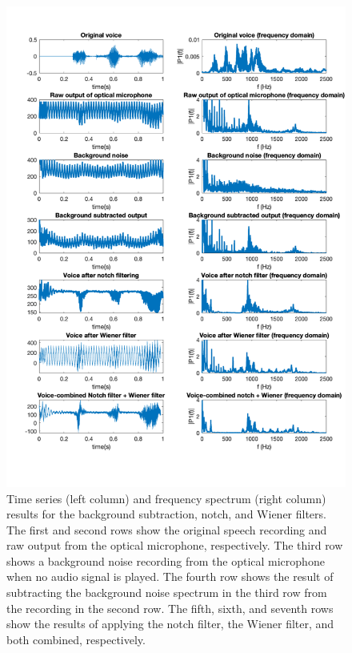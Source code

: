 \documentclass[paper-main.tex]{subfiles}
\begin{document}
\begin{figure}
	\begin{center}
	\includegraphics[width=.8\textwidth, trim={1cm 3cm 1cm 1cm}]{figures/notch_and_wiener_superplot_v2.pdf}
	\end{center}
	\caption{\label{fig:BackgroundNotchWienerCombined}
	Time series (left column) and frequency spectrum (right column) results for the background subtraction, notch, and Wiener filters.
	The first and second rows show the original speech recording and raw output from the optical microphone, respectively. 
    The third row shows a background noise recording from the optical microphone when no audio signal is played. 
    The fourth row shows the result of subtracting the background noise spectrum in the third row from the recording in the second row. 
	The fifth, sixth, and seventh rows show the results of applying the notch filter, the Wiener filter, and both combined, respectively.
	}
\end{figure}
\end{document}

